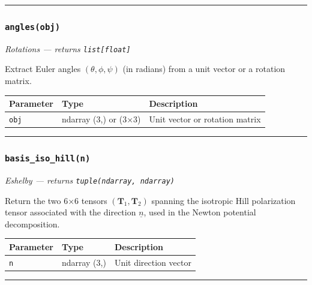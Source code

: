 \documentclass[
  a4paper,
  numbers=noendperiod,
  DIV=12]{scrreprt}
\newcounter{none} %
\newcommand{\uv}[1]{{\underline{{#1}}}}
\begin{document}
\begin{center}\rule{0.5\linewidth}{0.5pt}\end{center}

\subsubsection{\texorpdfstring{\texttt{angles(obj)}}{angles(obj)}}\label{api-angles}

\emph{Rotations --- returns \texttt{list{[}float{]}}}

Extract Euler angles \((\theta,\phi,\psi)\) (in radians) from a unit
vector or a rotation matrix.

{\def\LTcaptype{none} %
\begin{longtable}[]{@{}lll@{}}
\toprule\noalign{}
Parameter & Type & Description \\
\midrule\noalign{}
\endhead
\bottomrule\noalign{}
\endlastfoot
\texttt{obj} & ndarray (3,) or (3×3) & Unit vector or rotation matrix \\
\end{longtable}
}

\begin{center}\rule{0.5\linewidth}{0.5pt}\end{center}

\subsubsection{\texorpdfstring{\texttt{basis\_iso\_hill(n)}}{basis\_iso\_hill(n)}}\label{api-basis-iso-hill}

\emph{Eshelby --- returns \texttt{tuple(ndarray,\ ndarray)}}

Return the two 6×6 tensors \((\mathbf{T}_1, \mathbf{T}_2)\) spanning the
isotropic Hill polarization tensor associated with the direction
\(\uv{n}\), used in the Newton potential decomposition.

{\def\LTcaptype{none} %
\begin{longtable}[]{@{}lll@{}}
\toprule\noalign{}
Parameter & Type & Description \\
\midrule\noalign{}
\endhead
\bottomrule\noalign{}
\endlastfoot
\texttt{n} & ndarray (3,) & Unit direction vector \\
\end{longtable}
}

\begin{center}\rule{0.5\linewidth}{0.5pt}\end{center}
\end{document}
